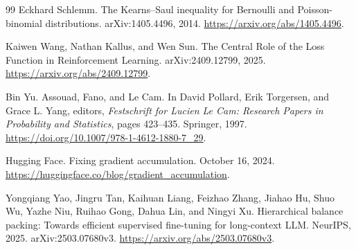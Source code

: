 \documentclass[11pt,twoside]{article}
\theoremstyle{definition}
\theoremstyle{remark}
\begin{document}
\begin{thebibliography}{99}
Eckhard Schlemm.
\newblock The Kearns--Saul inequality for Bernoulli and Poisson-binomial
distributions.
\newblock arXiv:1405.4496, 2014.
\newblock \url{https://arxiv.org/abs/1405.4496}.

Kaiwen Wang, Nathan Kallus, and Wen Sun.
\newblock The Central Role of the Loss Function in Reinforcement Learning.
\newblock arXiv:2409.12799, 2025.
\newblock \url{https://arxiv.org/abs/2409.12799}.

Bin Yu.
\newblock Assouad, Fano, and Le Cam.
\newblock In David Pollard, Erik Torgersen, and Grace L. Yang, editors,
\emph{Festschrift for Lucien Le Cam: Research Papers in Probability
and Statistics}, pages 423--435. Springer, 1997.
\newblock \url{https://doi.org/10.1007/978-1-4612-1880-7_29}.

Hugging Face.
\newblock Fixing gradient accumulation.
\newblock October 16, 2024.
\newblock \url{https://huggingface.co/blog/gradient_accumulation}.

Yongqiang Yao, Jingru Tan, Kaihuan Liang, Feizhao Zhang, Jiahao Hu,
Shuo Wu, Yazhe Niu, Ruihao Gong, Dahua Lin, and Ningyi Xu.
\newblock Hierarchical balance packing: Towards efficient supervised
fine-tuning for long-context LLM.
\newblock NeurIPS, 2025. arXiv:2503.07680v3.
\newblock \url{https://arxiv.org/abs/2503.07680v3}.

\end{thebibliography}
\end{document}
